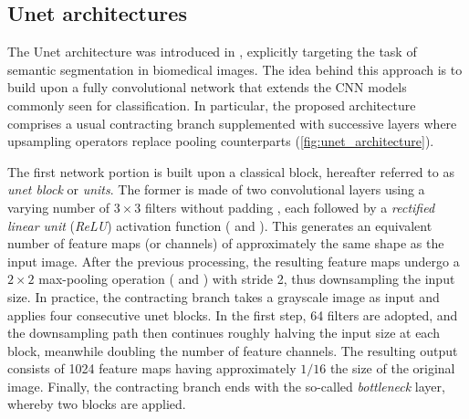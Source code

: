 \subsection{Unet architectures}
\label{sec:unets}

The Unet architecture was introduced in , explicitly targeting the task of semantic segmentation in biomedical images.
The idea behind this approach is to build upon a fully convolutional network \cite{long2015fully} that extends the CNN models commonly seen for classification.
In particular, the proposed architecture comprises a usual contracting branch supplemented with successive layers where upsampling operators replace pooling counterparts (\cref{fig:unet_architecture}).

The first network portion is built upon a classical block, hereafter referred to as \textit{unet block} or \textit{units}. 
The former is made of two convolutional layers using a varying number of $3\times3$ filters without padding \cite[Section 9.1]{Goodfellow2016deeplearning}, each followed by a \textit{rectified linear unit} (\textit{ReLU}) activation function ( and ).
This generates an equivalent number of feature maps (or channels) of approximately the same shape as the input image. %
After the previous processing, the resulting feature maps undergo a $2\times2$ max-pooling operation  ( and ) with stride 2, thus downsampling the input size.
In practice, the contracting branch takes a grayscale image as input and applies four consecutive unet blocks.
In the first step, 64 filters are adopted, and the downsampling path then continues roughly halving the input size at each block, meanwhile doubling the number of feature channels.
The resulting output consists of 1024 feature maps having approximately $1/16$ the size of the original image.
Finally, the contracting branch ends with the so-called \textit{bottleneck} layer, whereby two  blocks are applied.

